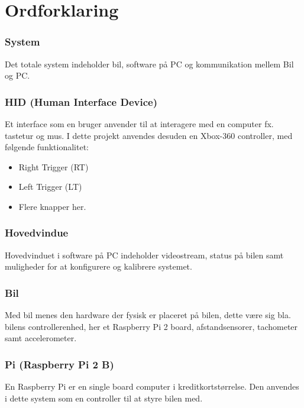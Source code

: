 
\section{Ordforklaring}

\subsubsection{System}
Det totale system indeholder bil, software på PC og kommunikation mellem Bil og PC.

\subsubsection{HID (Human Interface Device)}
Et interface som en bruger anvender til at interagere med en computer fx. tastetur og mus. I dette projekt anvendes desuden en Xbox-360 controller, med følgende funktionalitet: 

\begin{itemize}
	\item Right Trigger (RT)
	\item Left Trigger (LT)
	\item Flere knapper her.
\end{itemize}


\subsubsection{Hovedvindue}
Hovedvinduet i software på PC indeholder videostream, status på bilen samt muligheder for at konfigurere og kalibrere systemet.

\subsubsection{Bil}
Med bil menes den hardware der fysisk er placeret på bilen, dette være sig bla. bilens controllerenhed, her et Raspberry Pi 2 board, afstandsensorer, tachometer samt accelerometer.

\subsubsection{Pi (Raspberry Pi 2 B)}
En Raspberry Pi er en single board computer i kreditkortstørrelse. Den anvendes i dette system som en controller til at styre bilen med.

